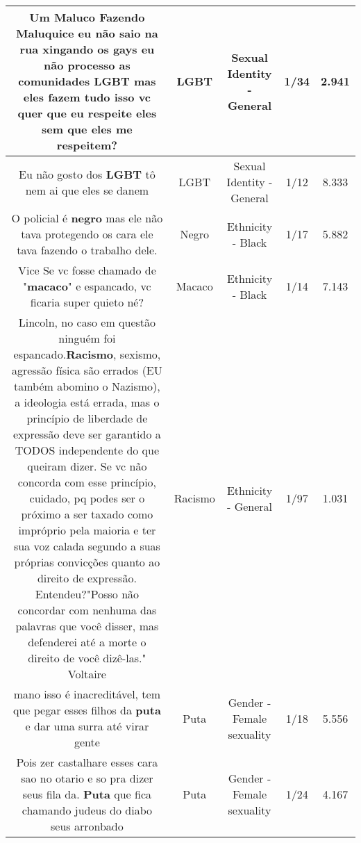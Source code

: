 \documentclass[11pt]{article}
\newlength\mylength
\begin{document}
\begin{center}
\begin{longtable}{|C{.65\mylength}|C{.30\mylength}|C{.12\mylength}|C{.12\mylength}|C{.12\mylength}|}
  \small Um Maluco Fazendo Maluquice eu não saio na rua xingando os gays eu não processo as comunidades \textbf{LGBT} mas eles fazem tudo isso vc quer que eu respeite eles sem que eles me respeitem?\normalsize   & LGBT & Sexual Identity - General & 1/34 & 2.941 \\  \hline
  \small Eu não gosto dos \textbf{LGBT} tô nem ai que eles se danem\normalsize   & LGBT & Sexual Identity - General & 1/12 & 8.333 \\  \hline
  \small O policial é  \textbf{negro} mas ele não  tava protegendo os cara ele tava fazendo o trabalho dele.\normalsize   & Negro & Ethnicity - Black & 1/17 & 5.882 \\  \hline
  \small Vice Se vc fosse chamado de "\textbf{macaco}" e  espancado, vc ficaria super quieto né?\normalsize   & Macaco & Ethnicity - Black & 1/14 & 7.143 \\  \hline
  \small Lincoln, no caso em questão ninguém foi espancado.\textbf{Racismo}, sexismo, agressão física são errados (EU também abomino o Nazismo), a ideologia está errada, mas o princípio de liberdade de expressão deve ser garantido a TODOS independente do que queiram dizer. Se vc não concorda com esse princípio, cuidado, pq podes ser o próximo a ser taxado como impróprio pela maioria e ter sua voz calada segundo a suas próprias convicções quanto ao direito de expressão. Entendeu?"Posso não concordar com nenhuma das palavras que você disser, mas defenderei até a morte o direito de você dizê-las."    Voltaire\normalsize   & Racismo & Ethnicity - General & 1/97 & 1.031 \\  \hline
  \small mano isso é inacreditável, tem que pegar esses filhos da \textbf{puta} e dar uma surra até virar gente\normalsize   & Puta & Gender - Female sexuality & 1/18 & 5.556 \\  \hline
  \small Pois zer castalhare esses cara sao no otario e so pra dizer seus fila da. \textbf{Puta} que fica chamando judeus do diabo seus arronbado\normalsize   & Puta & Gender - Female sexuality & 1/24 & 4.167 \\  \hline

\end{longtable}
\end{center}
\end{document}

